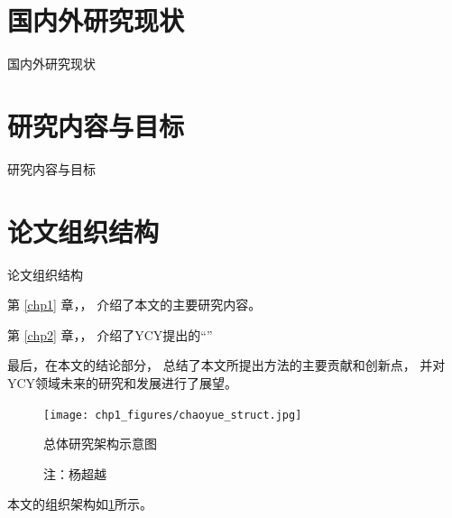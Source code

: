 \section{国内外研究现状}
\label{chp1:research_actuality}
%
国内外研究现状

\section{研究内容与目标}
\label{chp1:research_content}
%
研究内容与目标

\section{论文组织结构}
\label{chp1:structure}
%
论文组织结构

第 \ref{chp1} 章，\chptitleOne，
介绍了本文的主要研究内容。

第 \ref{chp2} 章，\chptitleTwo，
介绍了\gls{YCY}提出的``\chptitleTwo''

最后，在本文的结论部分，
总结了本文所提出方法的主要贡献和创新点，
并对\gls{YCY}领域未来的研究和发展进行了展望。

\begin{figure}[tb]
\centering
\texttt{[image: chp1\_figures/chaoyue\_struct.jpg]}
\caption[总体研究架构示意图]{总体研究架构示意图}
\caption*{注：杨超越}
\label{chp1:fig:struct}
\end{figure}

本文的组织架构如\cref{chp1:fig:struct}所示。

%
\ifx\mainpage\undefined

\fi